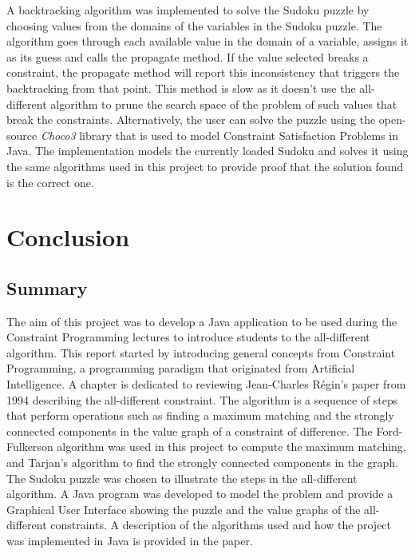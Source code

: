 \documentclass{l4proj}
\begin{document}
\noindent A backtracking algorithm was implemented to solve the Sudoku puzzle by choosing values from the domains of the variables in the Sudoku puzzle. The algorithm goes through each available value in the domain of a variable, assigns it as its guess and calls the propagate method. If the value selected breaks a constraint, the propagate method will report this inconsistency that triggers the backtracking from that point. This method is slow as it doesn't use the all-different algorithm to prune the search space of the problem of such values that break the constraints. Alternatively, the user can solve the puzzle using the open-source \textit{Choco3} library \cite{choco} that is used to model Constraint Satisfaction Problems in Java. The implementation models the currently loaded Sudoku and solves it using the same algorithms used in this project to provide proof that the solution found is the correct one.

\chapter{Conclusion}
\label{chap7conclusion} 
\section{Summary}
The aim of this project was to develop a Java application to be used during the Constraint Programming lectures to introduce students to the all-different algorithm. This report started by introducing general concepts from Constraint Programming, a programming paradigm that originated from Artificial Intelligence. A chapter is dedicated to reviewing Jean-Charles R\'egin's paper \cite{regin1994filtering} from 1994 describing the all-different constraint. The algorithm is a sequence of steps that perform operations such as finding a maximum matching and the strongly connected components in the value graph of a constraint of difference. The Ford-Fulkerson algorithm \cite{ford1956maximal} was used in this project to compute the maximum matching, and Tarjan's algorithm \cite{tarjan1972depth} to find the strongly connected components in the graph. The Sudoku puzzle was chosen to illustrate the steps in the all-different algorithm. A Java program was developed to model the problem and provide a Graphical User Interface showing the puzzle and the value graphs of the all-different constraints. A description of the algorithms used and how the project was implemented in Java is provided in the paper.
\end{document}

